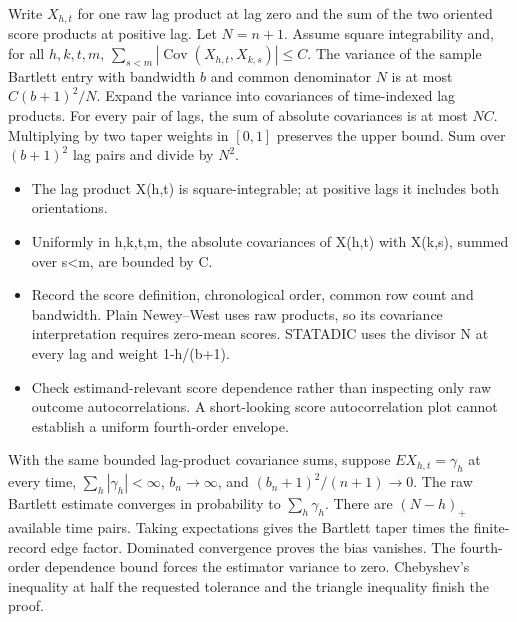 \expandafter\def\csname statadic@statement@STATADIC-HAC-004\endcsname{Write $X_{h,t}$ for one raw lag product at lag zero and
  the sum of the two oriented score products at positive lag. Let $N=n+1$.
  Assume square integrability and, for all $h,k,t,m$,
  $\sum_{s<m}|\operatorname{Cov}(X_{h,t},X_{k,s})|\le C$.
  The variance of the sample Bartlett entry with bandwidth $b$ and
  common denominator $N$ is at most $C(b+1)^2/N$.}
\expandafter\def\csname statadic@proof@STATADIC-HAC-004\endcsname{Expand the variance into covariances of time-indexed lag
  products. For every pair of lags, the sum of absolute covariances is at
  most $NC$. Multiplying by two taper weights in $[0,1]$ preserves the upper
  bound. Sum over $(b+1)^2$ lag pairs and divide by $N^2$.}
\expandafter\def\csname statadic@assumptions@STATADIC-HAC-004\endcsname{\begin{itemize}
\item The lag product X(h,t) is square-integrable; at positive lags it includes both orientations.
\item Uniformly in h,k,t,m, the absolute covariances of X(h,t) with X(k,s), summed over s<m, are bounded by C.
\end{itemize}}
\expandafter\def\csname statadic@diagnostics@STATADIC-HAC-004\endcsname{\begin{itemize}
\item Record the score definition, chronological order, common row count and bandwidth. Plain Newey–West uses raw products, so its covariance interpretation requires zero-mean scores. STATADIC uses the divisor N at every lag and weight 1-h/(b+1).
\item Check estimand-relevant score dependence rather than inspecting only raw outcome autocorrelations. A short-looking score autocorrelation plot cannot establish a uniform fourth-order envelope.
\end{itemize}}
\expandafter\def\csname statadic@statement@STATADIC-HAC-005\endcsname{With the same bounded lag-product covariance sums, suppose
  $E X_{h,t}=\gamma_h$ at every time, $\sum_h|\gamma_h|<\infty$,
  $b_n\to\infty$, and $(b_n+1)^2/(n+1)\to0$. The raw Bartlett
  estimate converges in probability to $\sum_h\gamma_h$.}
\expandafter\def\csname statadic@proof@STATADIC-HAC-005\endcsname{There are $(N-h)_+$ available time pairs. Taking expectations
  gives the Bartlett taper times the finite-record edge factor. Dominated
  convergence proves the bias vanishes. The fourth-order dependence bound
  forces the estimator variance to zero. Chebyshev's inequality at half the
  requested tolerance and the triangle inequality finish the proof.}
